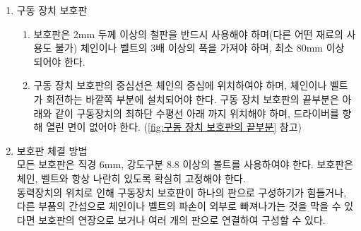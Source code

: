 \documentclass[final,a4paper,10pt]{report}
\begin{document}
\begin{enumerate}
\begin{enumerate}
      \item 구동 장치 보호판
        \begin{enumerate}
          \item 보호판은 2mm 두께 이상의 철판을 반드시 사용해야 하며(다른 어떤 재료의 사용도 불가) 체인이나 벨트의 3배 이상의 폭을 가져야 하며, 최소 80mm 이상 되어야 한다.
          \item 구동 장치 보호판의 중심선은 체인의 중심에 위치하여야 하며, 체인이나 벨트가 회전하는 바깥쪽 부분에 설치되어야 한다. 구동 장치 보호판의 끝부분은 아래와 같이 구동장치의 최하단 수평선 아래 까지 위치해야 하며, 드라이버를 향해 열린 면이 없어야 한다. (\cref{fig:구동 장치 보호판의 끝부분} 참고)
        \end{enumerate}
        
      \item 보호판 체결 방법\\
        모든 보호판은 직경 6mm, 강도구분 8.8 이상의 볼트를 사용하여야 한다. 보호판은 체인, 벨트와 항상 나란히 있도록 확실히 고정해야 한다.\\
        동력장치의 위치로 인해 구동장치 보호판이 하나의 판으로 구성하기가 힘들거나, 다른 부품의 간섭으로 체인이나 벨트의 파손이 외부로 빠져나가는 것을 막을 수 있다면 보호판의 연장으로 보거나 여러 개의 판으로 연결하여 구성할 수 있다.
    \end{enumerate}
    

\end{enumerate}
\end{document}

